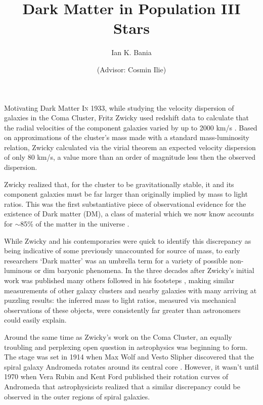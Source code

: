 \documentclass[a4paper,11pt]{article}
\title{\boldmath Dark Matter in Population III Stars}
\author{Ian K. Bania}
\author{(Advisor: Cosmin Ilie)}
\affiliation{Department of Physics and Astronomy, Colgate University\\
13 Oak Dr., Hamilton, NY 13346, U.S.A.}
\begin{document}
\maketitle


\begin{section}{Motivating Dark Matter}
    \lettrine{I}{n} 1933, while studying the velocity dispersion of galaxies in the Coma Cluster, Fritz Zwicky used redshift data to calculate that the radial velocities of the component galaxies varied by up to 2000 km/s \cite{Zwicky:1933}.
    Based on approximations of the cluster's mass made with a standard mass-luminosity relation, Zwicky calculated via the virial theorem an expected velocity dispersion of only 80 km/s, a value more than an order of magnitude less then the observed dispersion.

    Zwicky realized that, for the cluster to be gravitationally stable, it and its component galaxies must be far larger than originally implied by mass to light ratios.
    This was the first substantiative piece of observational evidence for the existence of Dark matter (DM), a class of material which we now know accounts for $\sim$85\% of the matter in the universe \cite{Bertone:2018}.

    While Zwicky and his contemporaries were quick to identify this discrepancy as being indicative of some previously unaccounted for source of mass, to early researchers `Dark matter' was an umbrella term for a variety of possible non-luminous or dim baryonic phenomena.
    In the three decades after Zwicky's initial work was published many others followed in his footsteps \cite{Zwicky:1937}\cite{Schwarzschild:1954}\cite{Babcock:1939}\cite{Kahn:1959}, making similar measurements of other galaxy clusters and nearby galaxies with many arriving at puzzling results: the inferred mass to light ratios, measured via mechanical observations of these objects, were consistently far greater than astronomers could easily explain.
     
    Around the same time as Zwicky's work on the Coma Cluster, an equally troubling and perplexing open question in astrophysics was beginning to form.
    The stage was set in 1914 when Max Wolf and Vesto Slipher discovered that the spiral galaxy Andromeda rotates around its central core \cite{Wolf:1914}.
    However, it wasn't until 1970 when Vera Rubin and Kent Ford published their rotation curves of Andromeda \cite{Rubin:1970} that astrophysicists realized that a similar discrepancy could be observed in the outer regions of spiral galaxies.


\end{section}
\end{document}
